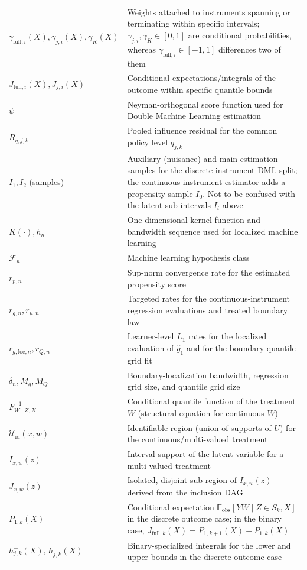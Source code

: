 {\begin{longtable}{lp{\dimexpr\textwidth-5.6cm\relax}}
$\gamma_{\text{full},i}(X), \gamma_{j,i}(X), \gamma_K(X)$ & Weights attached to instruments spanning or terminating within specific intervals; $\gamma_{j,i},\gamma_K\in[0,1]$ are conditional probabilities, whereas $\gamma_{\text{full},i}\in[-1,1]$ differences two of them \\
$J_{\text{full},i}(X), J_{j,i}(X)$ & Conditional expectations/integrals of the outcome within specific quantile bounds \\
$\psi$ & Neyman-orthogonal score function used for Double Machine Learning estimation \\
$R_{q,j,k}$ & Pooled influence residual for the common policy level $q_{j,k}$ \\
$I_1, I_2$ (samples) & Auxiliary (nuisance) and main estimation samples for the discrete-instrument DML split; the continuous-instrument estimator adds a propensity sample $I_0$. Not to be confused with the latent sub-intervals $I_i$ above \\
$K(\cdot), h_n$ & One-dimensional kernel function and bandwidth sequence used for localized machine learning \\
$\mathcal{F}_n$ & Machine learning hypothesis class \\
$r_{p,n}$ & Sup-norm convergence rate for the estimated propensity score \\
$r_{g,n}, r_{\mu,n}$ & Targeted rates for the continuous-instrument regression evaluations and treated boundary law \\
$r_{g,\mathrm{loc},n}, r_{Q,n}$ & Learner-level $L_1$ rates for the localized evaluation of $\hat g_1$ and for the boundary quantile grid fit \\
$\delta_n, M_g, M_Q$ & Boundary-localization bandwidth, regression grid size, and quantile grid size \\
$F_{W\mid Z,X}^{-1}$ & Conditional quantile function of the treatment $W$ (structural equation for continuous $W$) \\
$\mathcal{U}_{\text{id}}(x,w)$ & Identifiable region (union of supports of $U$) for the continuous/multi-valued treatment \\
$I_{x,w}(z)$ & Interval support of the latent variable for a multi-valued treatment \\
$J_{x,w}(z)$ & Isolated, disjoint sub-region of $I_{x,w}(z)$ derived from the inclusion DAG \\
$P_{1,k}(X)$ & Conditional expectation $\mathbb{E}_{\text{obs}}[YW \mid Z \in S_k, X]$ in the discrete outcome case; in the binary case, $J_{\text{full},k}(X) = P_{1,k+1}(X) - P_{1,k}(X)$ \\
$h_{j,k}^{-}(X),\, h_{j,k}^{+}(X)$ & Binary-specialized integrals for the lower and upper bounds in the discrete outcome case \\
\end{longtable}}
